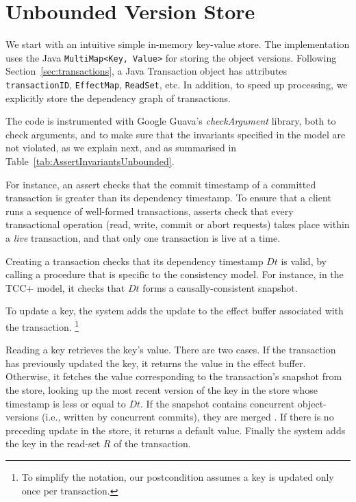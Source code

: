\documentclass[systeme,french,english]{compas2022}
\newcommand{\commentaire}[2][fromWhom?]{%
  {%
    \color{magenta}{\bfseries\sffamily\scriptsize$\triangleright$(#1:) #2$\triangleleft$}%
  }}
\begin{document}
\section{Unbounded Version Store}

\commentaire[Marc]{Pas strictement conforme au modèle : tu n'utilises pas les
  transactions mais leurs timestamps.}

We start with an intuitive simple in-memory key-value store.
The implementation uses the Java \texttt{MultiMap<Key, Value>} for
storing the object versions.
Following Section~\ref{sec:transactions}, a Java Transaction object has
attributes \texttt{transactionID}, \texttt{EffectMap}, \texttt{ReadSet},
etc. 
In addition, to speed up processing, we explicitly store the
dependency graph of transactions.

The code is instrumented with Google Guava's \emph{checkArgument} library\cite{guava}, both to check
arguments, and to make sure that the invariants specified in the model
are not violated, as we explain next, and as summarised in
Table~\ref{tab:AssertInvariantsUnbounded}.

For instance, an assert checks that the commit timestamp of a committed
transaction is greater than its dependency timestamp.
To ensure that a client runs a sequence of well-formed transactions,
asserts check that every transactional operation (read, write, commit or
abort requests) takes place within a \emph{live} transaction, and that
only one transaction is live at a time.

Creating a transaction checks that its dependency timestamp $Dt$ is
valid, by calling a procedure that is specific to the consistency model.
For instance, in the TCC+ model, it checks that $Dt$ forms a
causally-consistent snapshot.

To update a key, the system adds the update to the effect buffer
associated with the transaction.%
%
\footnote{
%
  To simplify the notation, our postcondition assumes a key is updated
  only once per transaction.
}
%

Reading a key retrieves the key's value.
There are two cases.
If the transaction has previously updated the key, it returns the value
in the effect buffer.
Otherwise, it fetches the value corresponding to the transaction's
snapshot from the store, looking up the most recent version of the key
in the store whose timestamp is less or equal to $\mathit{Dt}$.
If the snapshot contains concurrent object-versions (i.e., written by
concurrent commits), they are merged \cite{syn:rep:sh143}.
If there is no preceding update in the store, it returns a default
value.
Finally the system adds the key in the read-set $R$ of the transaction. 
\end{document}
